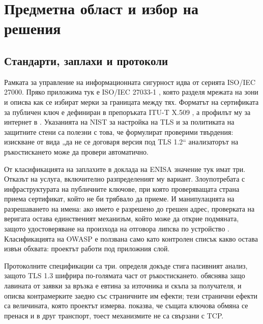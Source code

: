 \section{Предметна област и избор на решения}
\label{sec:domain}

\subsection{Стандарти, заплахи и протоколи}
\label{subsec:standards}

Рамката за управление на информационната сигурност идва от серията ISO/IEC 27000. Пряко
приложима тук е ISO/IEC 27033-1 \cite{iso27033_1}, която разделя мрежата на зони и описва как
се избират мерки за границата между тях. Форматът на сертификата за публичен ключ е дефиниран в
препоръката ITU-T X.509 \cite{itu_x509}, а профилът му за интернет в \cite{rfc5280}. Указанията
на NIST за настройка на TLS \cite{nist80052r2} и за политиката на защитните стени
\cite{nist80041r1} са полезни с това, че формулират проверими твърдения: изискване от вида „да
не се договаря версия под TLS 1.2“ анализаторът на ръкостискането може да провери автоматично.

От класификацията на заплахите в доклада на ENISA \cite{enisa_etl2023} значение тук имат три.
Отказът на услуга, включително разпределеният му вариант. Злоупотребата с инфраструктурата на
публичните ключове, при която проверяващата страна приема сертификат, който не би трябвало да
приеме. И манипулацията на разрешаването на имена: ако името е разрешено до грешен адрес,
проверката на веригата остава единственият механизъм, който може да открие подмяната, защото
удостоверяване на произхода на отговора липсва по устройство \cite{rfc4033}. Класификацията на
OWASP \cite{owasp_top10_2021} е ползвана само като контролен списък какво остава извън обхвата:
проектът работи под приложния слой.

Протоколните спецификации са три. \cite{rfc8446} определя докъде стига пасивният анализ, защото
TLS 1.3 шифрира по-голямата част от ръкостискането. \cite{rfc4987} обяснява защо лавината от
заявки за връзка е евтина за източника и скъпа за получателя, и описва контрамерките заедно със
страничните им ефекти; тези странични ефекти са величината, която проектът измерва.
\cite{rfc9001} показва, че същата ключова обмяна се пренася и в друг транспорт, тоест
механизмите не са свързани с TCP.

